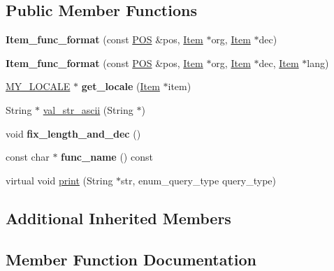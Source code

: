 \subsection*{Public Member Functions}
\begin{DoxyCompactItemize}
\item 
\mbox{\label{classItem__func__format_aa08bbc59ab2524cad34a5506b5f88f01}} 
{\bfseries Item\+\_\+func\+\_\+format} (const \mbox{\hyperlink{structYYLTYPE}{P\+OS}} \&pos, \mbox{\hyperlink{classItem}{Item}} $\ast$org, \mbox{\hyperlink{classItem}{Item}} $\ast$dec)
\item 
\mbox{\label{classItem__func__format_af691b003fab138859ea0fb5a89610965}} 
{\bfseries Item\+\_\+func\+\_\+format} (const \mbox{\hyperlink{structYYLTYPE}{P\+OS}} \&pos, \mbox{\hyperlink{classItem}{Item}} $\ast$org, \mbox{\hyperlink{classItem}{Item}} $\ast$dec, \mbox{\hyperlink{classItem}{Item}} $\ast$lang)
\item 
\mbox{\label{classItem__func__format_a9acaaeabbbe3a96df2b6173656d149db}} 
\mbox{\hyperlink{classMY__LOCALE}{M\+Y\+\_\+\+L\+O\+C\+A\+LE}} $\ast$ {\bfseries get\+\_\+locale} (\mbox{\hyperlink{classItem}{Item}} $\ast$item)
\item 
String $\ast$ \mbox{\hyperlink{classItem__func__format_a9f01cf724eacb711a5874955671fdc67}{val\+\_\+str\+\_\+ascii}} (String $\ast$)
\item 
\mbox{\label{classItem__func__format_a0129911da0465be0bf03042d2a161df8}} 
void {\bfseries fix\+\_\+length\+\_\+and\+\_\+dec} ()
\item 
\mbox{\label{classItem__func__format_a0db392a5dc82f712516cbad6b2e454ee}} 
const char $\ast$ {\bfseries func\+\_\+name} () const
\item 
virtual void \mbox{\hyperlink{classItem__func__format_aaf19ba682a8f2acb947222addb55b0d2}{print}} (String $\ast$str, enum\+\_\+query\+\_\+type query\+\_\+type)
\end{DoxyCompactItemize}
\subsection*{Additional Inherited Members}


\subsection{Member Function Documentation}
\mbox{\label{classItem__func__format_aaf19ba682a8f2acb947222addb55b0d2}} 
